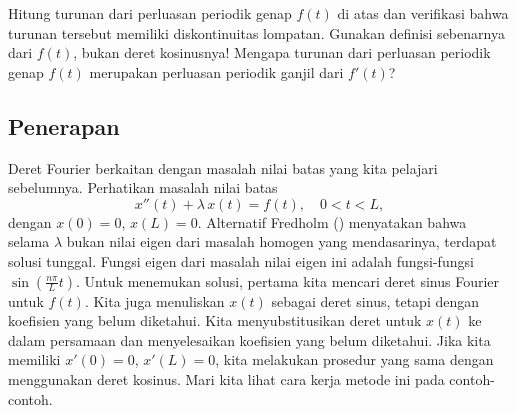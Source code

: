 \begin{exercise}
\leavevmode
\begin{tasks}
\task Hitung turunan dari perluasan periodik genap $f(t)$ di atas dan verifikasi bahwa turunan tersebut
memiliki diskontinuitas lompatan.  Gunakan definisi sebenarnya dari $f(t)$, bukan deret
kosinusnya!
\task Mengapa turunan dari perluasan periodik genap $f(t)$ merupakan
perluasan periodik ganjil dari $f'(t)$?
\end{tasks}
\end{exercise}

\subsection{Penerapan}

Deret Fourier berkaitan dengan masalah nilai batas yang
kita pelajari sebelumnya.
Perhatikan masalah nilai batas
\begin{equation*}
x''(t) + \lambda\, x(t) = f(t) , \quad 0 < t < L,
\end{equation*}
dengan \emph{}
$x(0) = 0$, $x(L) = 0$.
Alternatif Fredholm ()
menyatakan bahwa
selama $\lambda$ bukan nilai eigen dari masalah homogen yang mendasarinya,
terdapat solusi tunggal.
Fungsi eigen dari masalah nilai eigen ini adalah fungsi-fungsi
$\sin \left( \frac{n \pi}{L} t \right)$.
Untuk menemukan solusi,
pertama kita mencari deret sinus Fourier untuk $f(t)$.
Kita juga menuliskan $x(t)$ sebagai deret sinus, tetapi dengan koefisien yang belum diketahui.  
Kita menyubstitusikan deret untuk $x(t)$
ke dalam persamaan dan menyelesaikan koefisien yang belum diketahui.
Jika kita memiliki
\emph{}
$x'(0) = 0$, $x'(L) = 0$, kita melakukan prosedur yang sama dengan menggunakan deret
kosinus.
%
Mari kita lihat cara kerja metode ini pada contoh-contoh.

